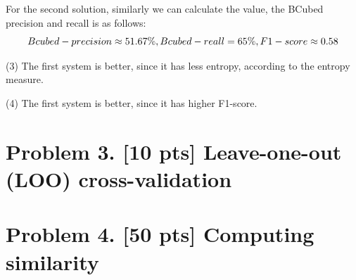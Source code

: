 \documentclass{article}
\begin{document}
For the second solution, similarly we can calculate the value, the BCubed precision and recall is as follows:
\begin{equation*}
Bcubed-precision \approx 51.67\%, ~\\
Bcubed-reall = 65\%, ~\\
F1-score \approx 0.58
\end{equation*}

(3) The first system is better, since it has less entropy, according to the entropy measure.

(4) The first system is better, since it has higher F1-score.

\section{Problem 3. [10 pts] Leave-one-out (LOO) cross-validation}


\section{Problem 4. [50 pts] Computing similarity}
\end{document}
